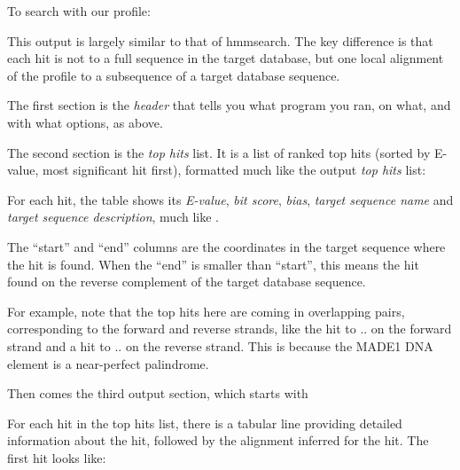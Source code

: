 To search  with our  profile:

   \vspace{1ex}
   \vspace{1ex}

This output is largely similar to that of hmmsearch. The key
difference is that each hit is not to a full sequence in the target
database, but one local alignment of the profile to a subsequence of a
target database sequence.

The first section is the \emph{header} that tells you what program you
ran, on what, and with what options, as above.

The second section is the \emph{top hits} list. It is a list
of ranked top hits (sorted by E-value, most significant hit first),
formatted much like the  output \emph{top hits} list:


For each hit, the table shows its \emph{E-value}, \emph{bit score},
\emph{bias}, \emph{target sequence name} and \emph{target sequence
  description}, much like .

The ``start'' and ``end'' columns are the coordinates in the target
sequence where the hit is found. When the ``end'' is smaller than
``start'', this means the hit found on the reverse complement of the
target database sequence.

For example, note that the top hits here are coming in overlapping
pairs, corresponding to the forward and reverse strands, like the hit
to \NMHafrom{}..\NMHato{} on the forward strand and a hit to
\NMHbfrom{}..\NMHbto{} on the reverse strand. This is because the
MADE1 DNA element is a near-perfect palindrome.

Then comes the third output section, which starts with


For each hit in the top hits list, there is a tabular line
providing detailed information about the hit, followed by the alignment
inferred for the hit. The first  hit
looks like: 

